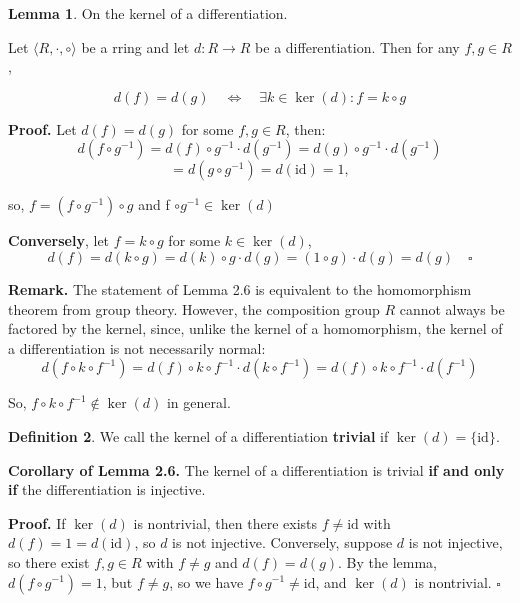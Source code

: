 \documentclass[12pt]{article}
\theoremstyle{definition}
\newtheorem{definition}{Definition}[section]
\newtheorem{lemma}[definition]{Lemma}
\begin{document}
\vspace{10pt}
\begin{lemma} On the kernel of a differentiation.

\vspace{5pt}
\noindent Let $\langle R, \cdot, \circ \rangle$ be a rring and let \(d: R \to R\) be a differentiation. Then for any \(f, g \in R\),

\[
d(f) = d(g) \quad \iff \quad \exists k \in \ker(d) \colon  f = k \circ g
\]

\vspace{5pt}
\textbf{Proof.} Let \(d(f) = d(g)\) for some \(f, g \in R\), then:
\[
d(f \circ g^{-1}) = d(f) \circ g^{-1} \cdot d(g^{-1}) = d(g) \circ g^{-1} \cdot d(g^{-1}) 
\]
\[
= d(g \circ g^{-1}) = d(\mathrm{id}) = 1,
\]

so, \(f = (f \circ g^{-1}) \circ g\) and f $\circ g^{-1} \in \ker(d)$

\vspace{5pt}
\textbf{Conversely}, let $f = k \circ g$ for some $k \in \ker(d)$,
\[
d(f) = d(k \circ g) = d(k) \circ g \cdot d(g) = (1 \circ g) \cdot d(g) = d(g) \quad \square
\]
\end{lemma}

\noindent\textbf{Remark.} The statement of Lemma 2.6 is equivalent to the homomorphism theorem from group theory. 
However, the composition group \(R\) cannot always be factored by the kernel, since, 
unlike the kernel of a homomorphism, the kernel of a differentiation is not necessarily normal:
\[
d(f \circ k \circ f^{-1}) = d(f) \circ k \circ f^{-1} \cdot d(k \circ f^{-1}) = d(f) \circ k \circ f^{-1} \cdot d(f^{-1})
\]

So, $f \circ k \circ f^{-1} \notin \ker(d)$ in general.

\vspace{10pt}
\begin{definition}
We call the kernel of a differentiation \textbf{trivial} if \(\ker(d) = \{\mathrm{id}\}\).
\end{definition}

\vspace{10pt}
\vspace{10pt}
\textbf{Corollary of Lemma 2.6.} The kernel of a differentiation is trivial \textbf{if and only if} the differentiation is injective.

\vspace{5pt}
\textbf{Proof.} If \(\ker(d)\) is nontrivial, then there exists \(f \neq \mathrm{id}\) with 
\(d(f) = 1 = d(\mathrm{id})\), so \(d\) is not injective. Conversely, suppose \(d\) is not injective, 
so there exist \(f, g \in R\) with \(f \neq g\) and \(d(f) = d(g)\). By the lemma, $d(f \circ g^{-1}) = 1$, 
but \(f \neq g\), so we have \(f \circ g^{-1} \neq \mathrm{id}\), and \(\ker(d)\) is nontrivial. $\square$
\end{document}
